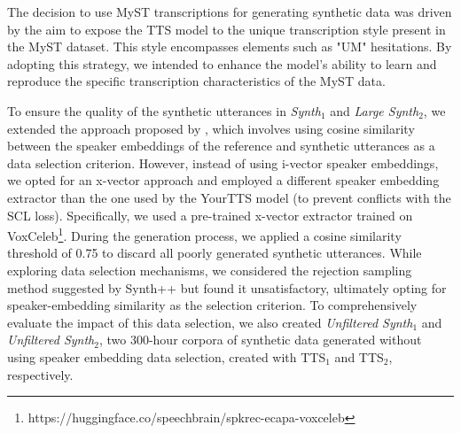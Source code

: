 The decision to use MyST transcriptions for generating synthetic data was driven by the aim to expose the TTS model to the unique transcription style present in the MyST dataset. This style encompasses elements such as "UM" hesitations. By adopting this strategy, we intended to enhance the model's ability to learn and reproduce the specific transcription characteristics of the MyST data.

To ensure the quality of the synthetic utterances in \textit{Synth$_1$} and \textit{Large Synth$_2$}, we extended the approach proposed by \cite{wang2021towards}, which involves using cosine similarity between the speaker embeddings of the reference and synthetic utterances as a data selection criterion. However, instead of using i-vector speaker embeddings, we opted for an x-vector approach and employed a different speaker embedding extractor than the one used by the YourTTS model (to prevent conflicts with the SCL loss). Specifically, we used a pre-trained x-vector extractor trained on VoxCeleb\footnote{https://huggingface.co/speechbrain/spkrec-ecapa-voxceleb}. During the generation process, we applied a cosine similarity threshold of 0.75 to discard all poorly generated synthetic utterances. While exploring data selection mechanisms, we considered the rejection sampling method suggested by Synth++ \cite{hu2022synt++} but found it unsatisfactory, ultimately opting for speaker-embedding similarity as the selection criterion. To comprehensively evaluate the impact of this data selection, we also created \textit{Unfiltered Synth$_1$} and \textit{Unfiltered Synth$_2$}, two 300-hour corpora of synthetic data generated without using speaker embedding data selection, created with TTS$_1$ and TTS$_2$, respectively.

